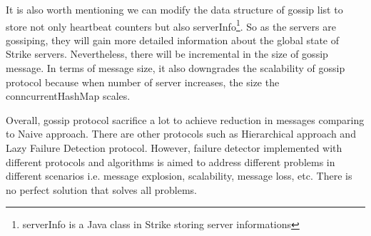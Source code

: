 \documentclass[dareport.tex]{subfiles}
\begin{document}
It is also worth mentioning we can modify the data structure of gossip list to store not only heartbeat counters but also serverInfo\footnote{serverInfo is a Java class in Strike storing server informations}. So as the servers are gossiping, they will gain more detailed information about the global state of Strike servers. Nevertheless, there will be incremental in the size of gossip message. In terms of message size, it also downgrades the scalability of gossip protocol because when number of server increases, the size the conncurrentHashMap scales.

Overall, gossip protocol sacrifice a lot to achieve reduction in messages comparing to Naive approach. There are other protocols such as Hierarchical approach and Lazy Failure Detection protocol\cite{failuredetector}. However, failure detector implemented with different protocols and algorithms is aimed to address different problems in different scenarios i.e. message explosion, scalability, message loss, etc. There is no perfect solution that solves all problems. 
\end{document}
